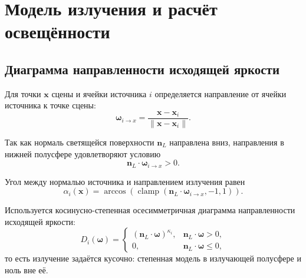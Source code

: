 \section{Модель излучения и расчёт освещённости}

\subsection{Диаграмма направленности исходящей яркости}

Для точки $\mathbf{x}$ сцены и ячейки источника $i$ определяется направление от ячейки источника к точке сцены:
\begin{equation}
\boldsymbol{\omega}_{i\rightarrow x}
=
\frac{\mathbf{x}-\mathbf{x}_i}
{\|\mathbf{x}-\mathbf{x}_i\|}.
\end{equation}

Так как нормаль светящейся поверхности $\mathbf{n}_L$ направлена вниз, направления в нижней полусфере удовлетворяют условию
\begin{equation}
\mathbf{n}_L\cdot\boldsymbol{\omega}_{i\rightarrow x}>0.
\end{equation}

Угол между нормалью источника и направлением излучения равен
\begin{equation}
\alpha_i(\mathbf{x})
=
\arccos\left(
\operatorname{clamp}
\left(
\mathbf{n}_L\cdot\boldsymbol{\omega}_{i\rightarrow x},
-1,1
\right)
\right).
\end{equation}

Используется косинусно-степенная осесимметричная диаграмма направленности исходящей яркости:
\begin{equation}
D_i(\boldsymbol{\omega})
=
\begin{cases}
\left(\mathbf{n}_L\cdot\boldsymbol{\omega}\right)^{\kappa_i}, & \mathbf{n}_L\cdot\boldsymbol{\omega}>0,\\
0, & \mathbf{n}_L\cdot\boldsymbol{\omega}\le 0,
\end{cases}
\end{equation}
то есть излучение задаётся кусочно: степенная модель в излучающей полусфере и ноль вне её.

